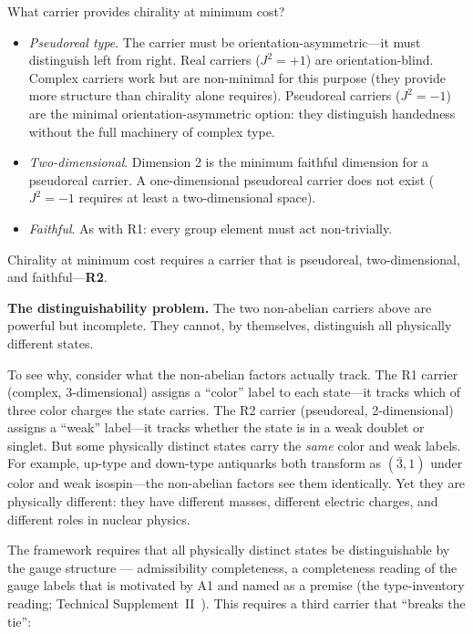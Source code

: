 \documentclass[11pt]{article}
\newenvironment{varlist}{\begin{itemize}[nosep,leftmargin=2em]}{\end{itemize}}
\begin{document}
What carrier provides chirality at minimum cost?

\begin{varlist}
\item \textit{Pseudoreal type}.  The carrier must be orientation-asymmetric---it must distinguish left from right.  Real carriers ($J^2 = +1$) are orientation-blind.  Complex carriers work but are non-minimal for this purpose (they provide more structure than chirality alone requires).  Pseudoreal carriers ($J^2 = -1$) are the minimal orientation-asymmetric option: they distinguish handedness without the full machinery of complex type.
\item \textit{Two-dimensional}.  Dimension 2 is the minimum faithful dimension for a pseudoreal carrier.  A one-dimensional pseudoreal carrier does not exist ($J^2 = -1$ requires at least a two-dimensional space).
\item \textit{Faithful}.  As with R1: every group element must act non-trivially.
\end{varlist}

\noindent Chirality at minimum cost requires a carrier that is pseudoreal, two-dimensional, and faithful---\textbf{R2}.

\medskip
\textbf{The distinguishability problem.}  The two non-abelian carriers above are powerful but incomplete.  They cannot, by themselves, distinguish all physically different states.

To see why, consider what the non-abelian factors actually track.  The R1 carrier (complex, 3-dimensional) assigns a ``color'' label to each state---it tracks which of three color charges the state carries.  The R2 carrier (pseudoreal, 2-dimensional) assigns a ``weak'' label---it tracks whether the state is in a weak doublet or singlet.  But some physically distinct states carry the \emph{same} color and weak labels.  For example, up-type and down-type antiquarks both transform as $(\bar{3}, 1)$ under color and weak isospin---the non-abelian factors see them identically.  Yet they are physically different: they have different masses, different electric charges, and different roles in nuclear physics.

The framework requires that all physically distinct states be distinguishable by the gauge structure --- admissibility completeness, a completeness reading of the gauge labels that is motivated by A1 and named as a premise (the type-inventory reading; Technical Supplement~II~\cite{BrookeP2FoundSupplement}).  This requires a third carrier that ``breaks the tie'':
\end{document}
